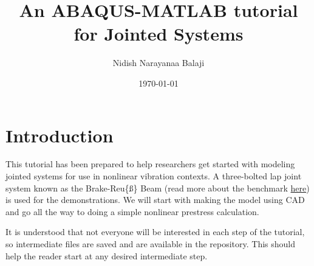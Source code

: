 \documentclass[11pt]{article}
\author{Nidish Narayanaa Balaji}
\date{\today}
\title{An ABAQUS-MATLAB tutorial for Jointed Systems}
\begin{document}
\maketitle
\tableofcontents

\pagebreak

\section{Introduction}
\label{sec:org934eabe}
This tutorial has been prepared to help researchers get started with modeling jointed systems for use in nonlinear vibration contexts.
A three-bolted lap joint system known as the Brake-Reu\{\ss\} Beam (read more about the benchmark \href{https://jointmechanics.org/index.php/Benchmarks\#The\_Brake-Reu\%C3\%9F\_Beams}{here}) is used for the demonstrations.
We will start with making the model using CAD and go all the way to doing a simple nonlinear prestress calculation.

It is understood that not everyone will be interested in each step of the tutorial, so intermediate files are saved and are available in the repository.
This should help the reader start at any desired intermediate step.
\end{document}
